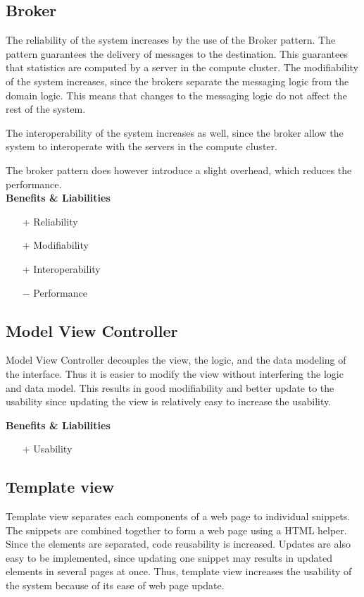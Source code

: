 \subsection*{Broker}
The reliability of the system increases by the use of the Broker pattern. The pattern guarantees the delivery of messages to the destination. This guarantees that statistics are computed by a server in the compute cluster.
The modifiability of the system increases, since the brokers separate the messaging logic from the domain logic. This means that changes to the messaging logic do not affect the rest of the system.

The interoperability of the system increases as well, since the broker allow the system to interoperate with the servers in the compute cluster.

The broker pattern does however introduce a slight overhead, which reduces the performance.\\
\textbf{Benefits \& Liabilities} ~
\begin{itemize}
\item[+] Reliability
\item[+] Modifiability
\item[+] Interoperability
\item[$-$] Performance
\end{itemize}

\subsection*{Model View Controller}
Model View Controller decouples the view, the logic, and the data modeling of the interface. Thus it is easier to modify the view without interfering the logic and data model. This results in good modifiability and better update to the usability since updating the view is relatively easy to increase the usability.

\textbf{Benefits \& Liabilities} ~
\begin{itemize} 
\item[+] Usability
\end{itemize}

\subsection*{Template view}
Template view separates each components of a web page to individual snippets. The snippets are combined together to form a web page using a HTML helper. Since the elements are separated, code reusability is increased. Updates are also easy to be implemented, since updating one snippet may results in updated elements in several pages at once. Thus, template view increases the usability of the system because of its ease of web page update.

